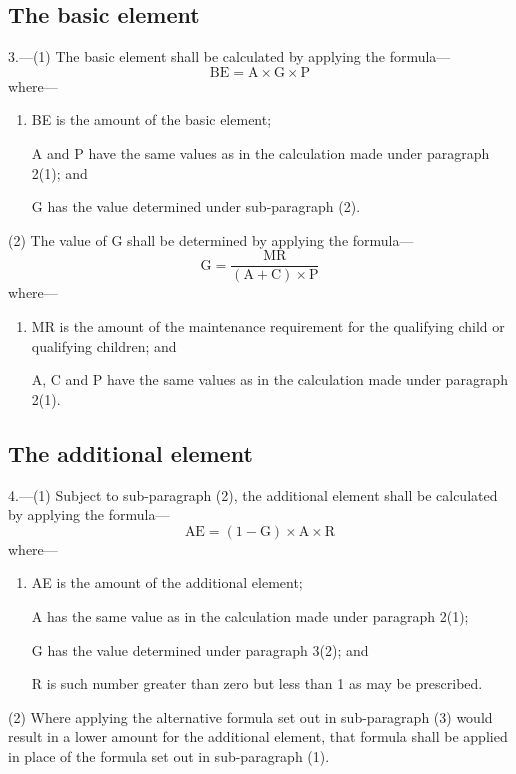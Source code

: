 \documentclass[a4paper]{article}
\begin{document}
{\subsection*{The basic element}

3.---(1) The basic element shall be calculated by applying the formula---
\[\textrm{BE} = \textrm{A} \times \textrm{G} \times \textrm{P}
\]
where---
\begin{enumerate}\item[]
BE is the amount of the basic element;

A and P have the same values as in the calculation made under paragraph 2(1); and

G has the value determined under sub-paragraph (2).
\end{enumerate}

(2) The value of G shall be determined by applying the formula---
\[\textrm{G} = \frac { \textrm{MR} } { (\textrm{A} + \textrm{C}) \times \textrm{P}}\]
where---
\begin{enumerate}\item[]
MR is the amount of the maintenance requirement for the qualifying child or qualifying children; and

A, C and P have the same values as in the calculation made under paragraph 2(1).
\end{enumerate}

\subsection*{The additional element}

4.---(1) Subject to sub-paragraph (2), the additional element shall be calculated by applying the formula---
\[
\textrm{AE} = (1 - \textrm{G}) \times \textrm{A} \times \textrm{R}
\]
where---
\begin{enumerate}\item[]
AE is the amount of the additional element;

A has the same value as in the calculation made under paragraph 2(1);


G has the value determined under paragraph 3(2); and

R is such number greater than zero but less than 1 as may be prescribed.
\end{enumerate}

(2) Where applying the alternative formula set out in sub-paragraph (3) would result in a lower amount for the additional element, that formula shall be applied in place of the formula set out in sub-paragraph (1).

}
\end{document}
